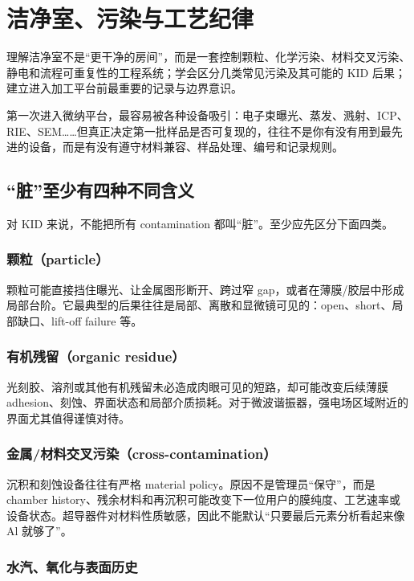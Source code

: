 \chapter{洁净室、污染与工艺纪律}

\begin{chaptergoal}
理解洁净室不是“更干净的房间”，而是一套控制颗粒、化学污染、材料交叉污染、静电和流程可重复性的工程系统；学会区分几类常见污染及其可能的 KID 后果；建立进入加工平台前最重要的记录与边界意识。
\end{chaptergoal}

第一次进入微纳平台，最容易被各种设备吸引：电子束曝光、蒸发、溅射、ICP、RIE、SEM……但真正决定第一批样品是否可复现的，往往不是你有没有用到最先进的设备，而是有没有遵守材料兼容、样品处理、编号和记录规则。

\section{“脏”至少有四种不同含义}

对 KID 来说，不能把所有 contamination 都叫“脏”。至少应先区分下面四类。

\subsection{颗粒（particle）}

颗粒可能直接挡住曝光、让金属图形断开、跨过窄 gap，或者在薄膜/胶层中形成局部台阶。它最典型的后果往往是局部、离散和显微镜可见的：open、short、局部缺口、lift-off failure 等。

\subsection{有机残留（organic residue）}

光刻胶、溶剂或其他有机残留未必造成肉眼可见的短路，却可能改变后续薄膜 adhesion、刻蚀、界面状态和局部介质损耗。对于微波谐振器，强电场区域附近的界面尤其值得谨慎对待。

\subsection{金属/材料交叉污染（cross-contamination）}

沉积和刻蚀设备往往有严格 material policy。原因不是管理员“保守”，而是 chamber history、残余材料和再沉积可能改变下一位用户的膜纯度、工艺速率或设备状态。超导器件对材料性质敏感，因此不能默认“只要最后元素分析看起来像 Al 就够了”。

\subsection{水汽、氧化与表面历史}

